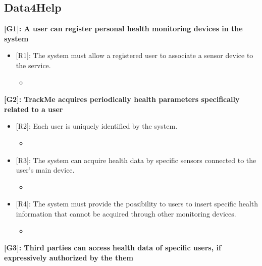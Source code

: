 {\color{Blue}\subsection{Data4Help}}
\raggedright
\textbf{[G1]: A user can register personal health monitoring devices in the system}
\begin{itemize}[partopsep=0.7 cm]
	\item {[R1]: The system must allow a registered user to associate a sensor device to the service.}
	\begin{itemize}
		\item {}
	\end{itemize}
\end{itemize}
\textbf{[G2]: TrackMe acquires periodically health parameters specifically related to a user}
\begin{itemize}
	\item {[R2]: Each user is uniquely identified by the system.}
	\begin{itemize}
		\item {}
	\end{itemize}
	\item {[R3]: The system can acquire health data by specific sensors connected to the user's main device.}
	\begin{itemize}
		\item {}
	\end{itemize}
	\item {[R4]: The system must provide the possibility to users to insert specific health information that cannot be acquired through other monitoring devices.}
	\begin{itemize}
		\item {}
	\end{itemize}   
	
\end{itemize}
\textbf{[G3]: Third parties can access health data of specific users, if expressively authorized by the them}

